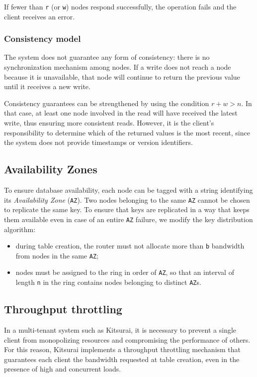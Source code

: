 If fewer than \texttt{r} (or \texttt{w}) nodes respond successfully, the operation fails and the client receives an error.

\subsubsection{Consistency model}
\label{subsubsec:consistency-model}

The system does not guarantee any form of consistency: there is no synchronization mechanism among nodes.
If a write does not reach a node because it is unavailable, that node will continue to return the previous value until it receives a new write.

Consistency guarantees can be strengthened by using the condition $r + w > n$.
In that case, at least one node involved in the read will have received the latest write, thus ensuring more consistent reads.
However, it is the client's responsibility to determine which of the returned values is the most recent, since the system does not provide timestamps or version identifiers.

\subsection{Availability Zones}
\label{subsec:availability-zones}

To ensure database availability, each node can be tagged with a string identifying its \emph{Availability Zone} (\texttt{AZ}).
Two nodes belonging to the same \texttt{AZ} cannot be chosen to replicate the same key.
To ensure that keys are replicated in a way that keeps them available even in case of an entire \texttt{AZ} failure, we modify the key distribution algorithm:
\begin{itemize}
    \item during table creation, the router must not allocate more than \texttt{b} bandwidth from nodes in the same \texttt{AZ};
    \item nodes must be assigned to the ring in order of \texttt{AZ}, so that an interval of length \texttt{n} in the ring contains nodes belonging to distinct \texttt{AZ}s.
\end{itemize}

\subsection{Throughput throttling}
\label{subsec:throughput-throttling}

In a multi-tenant system such as Kitsurai, it is necessary to prevent a single client from monopolizing resources and compromising the performance of others.
For this reason, Kitsurai implements a throughput throttling mechanism that guarantees each client the bandwidth requested at table creation, even in the presence of high and concurrent loads.

